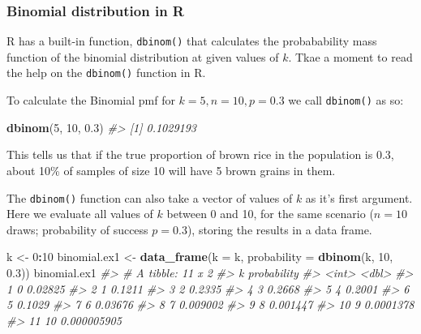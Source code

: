 \documentclass[]{book}
\newenvironment{Shaded}{\begin{snugshade}}{\end{snugshade}}
\newcommand{\CommentTok}[1]{\textcolor[rgb]{0.56,0.35,0.01}{\textit{#1}}}
\newcommand{\DataTypeTok}[1]{\textcolor[rgb]{0.13,0.29,0.53}{#1}}
\newcommand{\DecValTok}[1]{\textcolor[rgb]{0.00,0.00,0.81}{#1}}
\newcommand{\FloatTok}[1]{\textcolor[rgb]{0.00,0.00,0.81}{#1}}
\newcommand{\KeywordTok}[1]{\textcolor[rgb]{0.13,0.29,0.53}{\textbf{#1}}}
\newcommand{\NormalTok}[1]{#1}
\newcommand{\OperatorTok}[1]{\textcolor[rgb]{0.81,0.36,0.00}{\textbf{#1}}}
\newcommand{\StringTok}[1]{\textcolor[rgb]{0.31,0.60,0.02}{#1}}
\theoremstyle{definition}
\theoremstyle{definition}
\theoremstyle{definition}
\theoremstyle{remark}
\begin{document}
\hypertarget{binomial-distribution-in-r}{%
\subsubsection{Binomial distribution in
R}\label{binomial-distribution-in-r}}

R has a built-in function, \texttt{dbinom()} that calculates the
probabability mass function of the binomial distribution at given values
of \(k\). Tkae a moment to read the help on the \texttt{dbinom()}
function in R.

To calculate the Binomial pmf for \(k=5, n = 10, p = 0.3\) we call
\texttt{dbinom()} as so:

\begin{Shaded}
\begin{Highlighting}[]
\KeywordTok{dbinom}\NormalTok{(}\DecValTok{5}\NormalTok{, }\DecValTok{10}\NormalTok{, }\FloatTok{0.3}\NormalTok{)}
\CommentTok{#> [1] 0.1029193}
\end{Highlighting}
\end{Shaded}

This tells us that if the true proportion of brown rice in the
population is 0.3, about 10\% of samples of size 10 will have 5 brown
grains in them.

The \texttt{dbinom()} function can also take a vector of values of \(k\)
as it's first argument. Here we evaluate all values of \(k\) between 0
and 10, for the same scenario (\(n=10\) draws; probability of success
\(p = 0.3\)), storing the results in a data frame.

\begin{Shaded}
\begin{Highlighting}[]
\NormalTok{k <-}\StringTok{ }\DecValTok{0}\OperatorTok{:}\DecValTok{10}
\NormalTok{binomial.ex1 <-}\StringTok{ }\KeywordTok{data_frame}\NormalTok{(}\DataTypeTok{k =}\NormalTok{ k,}
                           \DataTypeTok{probability =} \KeywordTok{dbinom}\NormalTok{(k, }\DecValTok{10}\NormalTok{, }\FloatTok{0.3}\NormalTok{))}
\NormalTok{binomial.ex1}
\CommentTok{#> # A tibble: 11 x 2}
\CommentTok{#>        k probability}
\CommentTok{#>    <int>       <dbl>}
\CommentTok{#>  1     0 0.02825    }
\CommentTok{#>  2     1 0.1211     }
\CommentTok{#>  3     2 0.2335     }
\CommentTok{#>  4     3 0.2668     }
\CommentTok{#>  5     4 0.2001     }
\CommentTok{#>  6     5 0.1029     }
\CommentTok{#>  7     6 0.03676    }
\CommentTok{#>  8     7 0.009002   }
\CommentTok{#>  9     8 0.001447   }
\CommentTok{#> 10     9 0.0001378  }
\CommentTok{#> 11    10 0.000005905}
\end{Highlighting}
\end{Shaded}
\end{document}
